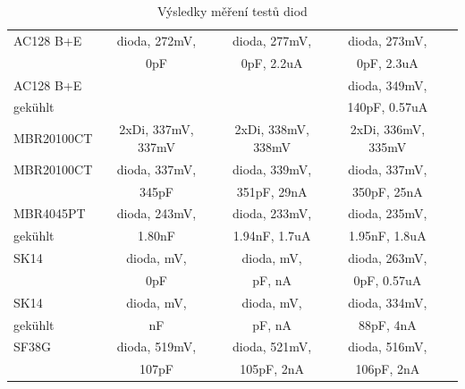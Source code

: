 \begin{table}[H]
\begin{center}
\begin{tabular}{| l | c | c | c | c |}
    \hline
AC128 B+E  & dioda, 272mV,        & dioda, 277mV,              & dioda, 273mV,             \\
           &               0pF    &               0pF, 2.2uA   &               0pF, 2.3uA  \\
    \hline
AC128 B+E  &                      &                     & dioda, 349mV,               \\
gekühlt    &                      &                     &               140pF, 0.57uA \\
    \hline
MBR20100CT & 2xDi, 337mV, 337mV   & 2xDi, 338mV, 338mV  & 2xDi, 336mV, 335mV  \\
    \hline
MBR20100CT & dioda, 337mV,        & dioda, 339mV,             & dioda, 337mV,            \\
           &               345pF  &               351pF, 29nA &               350pF, 25nA\\
    \hline
MBR4045PT  & dioda, 243mV,        & dioda, 233mV,               & dioda, 235mV,              \\
gekühlt    &               1.80nF &               1.94nF, 1.7uA &               1.95nF, 1.8uA\\
    \hline
SK14       & dioda,    mV,        & dioda,    mV,               & dioda, 263mV,              \\
           &                  0pF &                   pF,    nA &               0pF, 0.57uA\\
    \hline
SK14       & dioda,    mV,        & dioda,    mV,               & dioda, 334mV,              \\
gekühlt    &                   nF &                   pF,    nA &               88pF, 4nA\\
    \hline
SF38G      & dioda, 519mV,        & dioda, 521mV,            & dioda, 516mV,            \\
           &               107pF  &               105pF, 2nA &               106pF, 2nA \\
    \hline
    \end{tabular}
  \end{center}
  \caption{Výsledky měření testů diod}
  \label{tab:diodas} 
\end{table}

